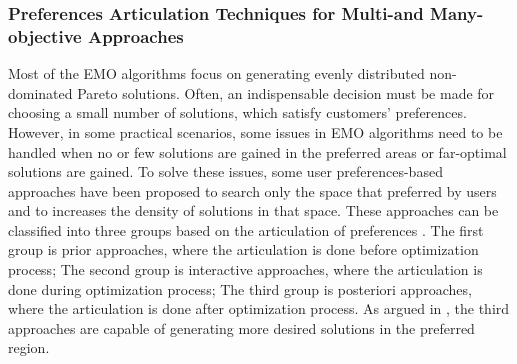 \subsubsection{Preferences Articulation Techniques for Multi-and Many-objective Approaches}\label{PreferencesMultiObjective}
Most of the EMO algorithms focus on generating evenly distributed non-dominated Pareto solutions. Often, an indispensable decision must be made for choosing a small number of solutions, which satisfy customers' preferences. However, in some practical scenarios, some issues in EMO algorithms need to be handled when no or few solutions are gained in the preferred areas or far-optimal solutions are gained. To solve these issues, some user preferences-based approaches have been proposed to search only the space that preferred by users and to increases the density of solutions in that space. These approaches can be classified into three groups based on the articulation of preferences \cite{van2000multiobjective}. The first group is prior approaches, where the articulation is done before optimization process; The second group is interactive approaches, where the articulation is done during optimization process; The third group is posteriori approaches, where the articulation is done after optimization process. As argued in \cite{giagkiozis2014pareto}, the third approaches are capable of generating more desired solutions in the preferred region. 


